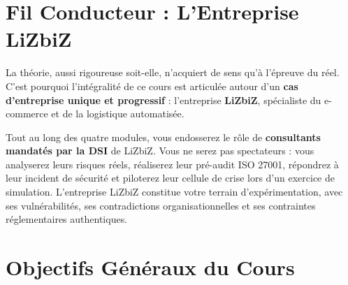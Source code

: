 \section*{Fil Conducteur : L'Entreprise LiZbiZ}

La théorie, aussi rigoureuse soit-elle, n'acquiert de sens qu'à l'épreuve du réel. C'est pourquoi l'intégralité de ce cours est articulée autour d'un \textbf{cas d'entreprise unique et progressif} : l'entreprise \textbf{LiZbiZ}, spécialiste du e-commerce et de la logistique automatisée.

\begin{boxlizbiz}
Tout au long des quatre modules, vous endosserez le rôle de \textbf{consultants mandatés par la DSI} de LiZbiZ. Vous ne serez pas spectateurs : vous analyserez leurs risques réels, réaliserez leur pré-audit ISO 27001, répondrez à leur incident de sécurité et piloterez leur cellule de crise lors d'un exercice de simulation. L'entreprise LiZbiZ constitue votre terrain d'expérimentation, avec ses vulnérabilités, ses contradictions organisationnelles et ses contraintes réglementaires authentiques.
\end{boxlizbiz}

\section*{Objectifs Généraux du Cours}

